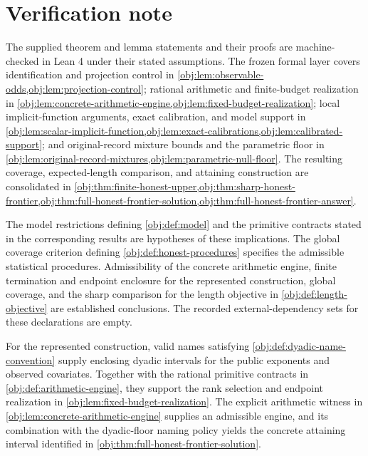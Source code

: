 \documentclass[11pt]{article}
\begin{document}
\section{Verification note}

The supplied theorem and lemma statements and their proofs are machine-checked in Lean 4 under their stated assumptions. The frozen formal layer covers identification and projection control in \cref{obj:lem:observable-odds,obj:lem:projection-control}; rational arithmetic and finite-budget realization in \cref{obj:lem:concrete-arithmetic-engine,obj:lem:fixed-budget-realization}; local implicit-function arguments, exact calibration, and model support in \cref{obj:lem:scalar-implicit-function,obj:lem:exact-calibrations,obj:lem:calibrated-support}; and original-record mixture bounds and the parametric floor in \cref{obj:lem:original-record-mixtures,obj:lem:parametric-null-floor}. The resulting coverage, expected-length comparison, and attaining construction are consolidated in \cref{obj:thm:finite-honest-upper,obj:thm:sharp-honest-frontier,obj:thm:full-honest-frontier-solution,obj:thm:full-honest-frontier-answer}.

The model restrictions defining \cref{obj:def:model} and the primitive contracts stated in the corresponding results are hypotheses of these implications. The global coverage criterion defining \cref{obj:def:honest-procedures} specifies the admissible statistical procedures. Admissibility of the concrete arithmetic engine, finite termination and endpoint enclosure for the represented construction, global coverage, and the sharp comparison for the length objective in \cref{obj:def:length-objective} are established conclusions. The recorded external-dependency sets for these declarations are empty.

For the represented construction, valid names satisfying \cref{obj:def:dyadic-name-convention} supply enclosing dyadic intervals for the public exponents and observed covariates. Together with the rational primitive contracts in \cref{obj:def:arithmetic-engine}, they support the rank selection and endpoint realization in \cref{obj:lem:fixed-budget-realization}. The explicit arithmetic witness in \cref{obj:lem:concrete-arithmetic-engine} supplies an admissible engine, and its combination with the dyadic-floor naming policy yields the concrete attaining interval identified in \cref{obj:thm:full-honest-frontier-solution}.
\end{document}
